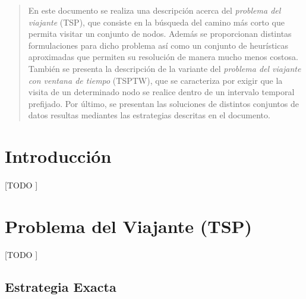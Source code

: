 \documentclass[spanish]{article}
\begin{document}
	\maketitle %

	\thispagestyle{fancy} %



	\begin{abstract}
		\noindent En este documento se realiza una descripción acerca del \emph{problema del viajante} (TSP), que consiste en la búsqueda del camino más corto que permita visitar un conjunto de nodos. Además se proporcionan distintas formulaciones para dicho problema así como un conjunto de heurísticas aproximadas que permiten su resolución de manera mucho menos costosa. También se presenta la descripción de la variante del \emph{problema del viajante con ventana de tiempo} (TSPTW), que se caracteriza por exigir que la visita de un determinado nodo se realice dentro de un intervalo temporal prefijado. Por último, se presentan las soluciones de distintos conjuntos de datos resultas mediantes las estrategias descritas en el documento.
	\end{abstract}


	\section{Introducción}
	\label{sec:intro}

		\paragraph{}
		[TODO ]

	\section{Problema del Viajante (TSP)}

		\paragraph{}
		[TODO ]

		\subsection{Estrategia Exacta}
\end{document}
